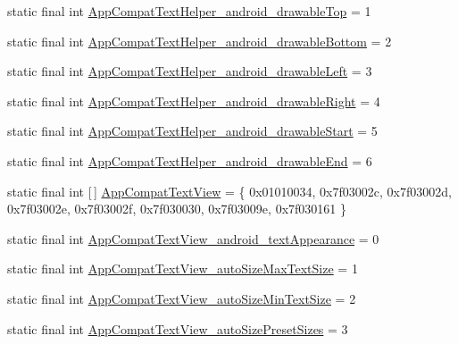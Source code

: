 \begin{DoxyCompactItemize}
\item 
static final int \mbox{\hyperlink{classandroid_1_1support_1_1v7_1_1appcompat_1_1R_1_1styleable_abe33b365b60b05e2e03d01f4b7a20d9d}{App\+Compat\+Text\+Helper\+\_\+android\+\_\+drawable\+Top}} = 1
\item 
static final int \mbox{\hyperlink{classandroid_1_1support_1_1v7_1_1appcompat_1_1R_1_1styleable_a4c96d9f5e48f70aa3d029ea24de764e0}{App\+Compat\+Text\+Helper\+\_\+android\+\_\+drawable\+Bottom}} = 2
\item 
static final int \mbox{\hyperlink{classandroid_1_1support_1_1v7_1_1appcompat_1_1R_1_1styleable_ac4d5f0c9720fa98bb896d20a382c6a69}{App\+Compat\+Text\+Helper\+\_\+android\+\_\+drawable\+Left}} = 3
\item 
static final int \mbox{\hyperlink{classandroid_1_1support_1_1v7_1_1appcompat_1_1R_1_1styleable_af41cfde8b06ee8402af254dc89615611}{App\+Compat\+Text\+Helper\+\_\+android\+\_\+drawable\+Right}} = 4
\item 
static final int \mbox{\hyperlink{classandroid_1_1support_1_1v7_1_1appcompat_1_1R_1_1styleable_a7d656f49d67140afb26bed6f6a27b67a}{App\+Compat\+Text\+Helper\+\_\+android\+\_\+drawable\+Start}} = 5
\item 
static final int \mbox{\hyperlink{classandroid_1_1support_1_1v7_1_1appcompat_1_1R_1_1styleable_a6dc62e88b84309ee235bd27214790683}{App\+Compat\+Text\+Helper\+\_\+android\+\_\+drawable\+End}} = 6
\item 
static final int \mbox{[}$\,$\mbox{]} \mbox{\hyperlink{classandroid_1_1support_1_1v7_1_1appcompat_1_1R_1_1styleable_a87384e67b6e421e7c07536d9afe8d185}{App\+Compat\+Text\+View}} = \{ 0x01010034, 0x7f03002c, 0x7f03002d, 0x7f03002e, 0x7f03002f, 0x7f030030, 0x7f03009e, 0x7f030161 \}
\item 
static final int \mbox{\hyperlink{classandroid_1_1support_1_1v7_1_1appcompat_1_1R_1_1styleable_a3ce93dcbd8fd4d957a09de9dde780dca}{App\+Compat\+Text\+View\+\_\+android\+\_\+text\+Appearance}} = 0
\item 
static final int \mbox{\hyperlink{classandroid_1_1support_1_1v7_1_1appcompat_1_1R_1_1styleable_ab425aaab70802b2f1d56e5ffa1239b97}{App\+Compat\+Text\+View\+\_\+auto\+Size\+Max\+Text\+Size}} = 1
\item 
static final int \mbox{\hyperlink{classandroid_1_1support_1_1v7_1_1appcompat_1_1R_1_1styleable_a4cdcfd0ade1b03a2e00ff87794215b64}{App\+Compat\+Text\+View\+\_\+auto\+Size\+Min\+Text\+Size}} = 2
\item 
static final int \mbox{\hyperlink{classandroid_1_1support_1_1v7_1_1appcompat_1_1R_1_1styleable_ae4bce7d18b476a438eadda6174d423d6}{App\+Compat\+Text\+View\+\_\+auto\+Size\+Preset\+Sizes}} = 3

\end{DoxyCompactItemize}
